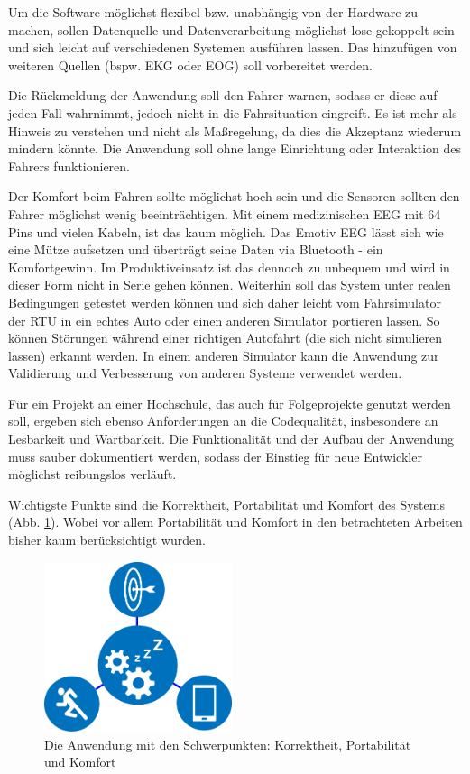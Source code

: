 Um die Software möglichst flexibel bzw. unabhängig von der Hardware zu machen, sollen Datenquelle und Datenverarbeitung möglichst lose gekoppelt sein und sich leicht auf verschiedenen Systemen ausführen lassen. Das hinzufügen von weiteren Quellen (bspw. EKG oder EOG) soll vorbereitet werden.

Die Rückmeldung der Anwendung soll den Fahrer warnen, sodass er diese auf jeden Fall wahrnimmt, jedoch nicht in die Fahrsituation eingreift. Es ist mehr als Hinweis zu verstehen und nicht als Maßregelung, da dies die Akzeptanz wiederum mindern könnte. Die Anwendung soll ohne lange Einrichtung oder Interaktion des Fahrers funktionieren.

Der Komfort beim Fahren sollte möglichst hoch sein und die Sensoren sollten den Fahrer möglichst wenig beeinträchtigen. Mit einem medizinischen EEG mit 64 Pins und vielen Kabeln, ist das kaum möglich. Das Emotiv EEG lässt sich wie eine Mütze aufsetzen und überträgt seine Daten via Bluetooth - ein Komfortgewinn. Im Produktiveinsatz ist das dennoch zu unbequem und wird in dieser Form nicht in Serie gehen können.
Weiterhin soll das System unter realen Bedingungen getestet werden können und sich daher leicht vom Fahrsimulator der \acl{RTU} in ein echtes Auto oder einen anderen Simulator portieren lassen. So können Störungen während einer richtigen Autofahrt (die sich nicht simulieren lassen) erkannt werden. In einem anderen Simulator kann die Anwendung zur Validierung und Verbesserung von anderen Systeme verwendet werden.

Für ein Projekt an einer Hochschule, das auch für Folgeprojekte genutzt werden soll, ergeben sich ebenso Anforderungen an die Codequalität, insbesondere an Lesbarkeit und Wartbarkeit. Die Funktionalität und der Aufbau der Anwendung muss sauber dokumentiert werden, sodass der Einstieg für neue Entwickler möglichst reibungslos verläuft.

Wichtigste Punkte sind die Korrektheit, Portabilität und Komfort des Systems (Abb. \ref{fig:emphasis}). Wobei vor allem Portabilität und Komfort in den betrachteten Arbeiten bisher kaum berücksichtigt wurden.

\begin{figure}[h] 
  \begin{center}
    \includegraphics[width=5.5cm]{img/all}
    \caption[Schwerpuntke der Anwendung]{Die Anwendung mit den Schwerpunkten: Korrektheit, Portabilität und Komfort \label{fig:emphasis}}
  \end{center}
\end{figure}